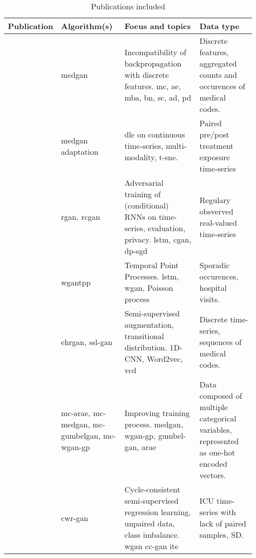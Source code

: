     \begin{sidewaystable}[htbp]
    \scriptsize
    \centering
    \caption{Publications included}\label{tab:publications}
      
        \begin{tabularx}{\textwidth}{@{}p{4cm}XXX@{}} \toprule
            Publication & Algorithm(s) & Focus and topics & Data type \\ \midrule
            
            \cite{Choi2017-nt}
            & \gls{medgan} 
            & Incompatibility of backpropagation with discrete features. \gls{mc}, \gls{ae}, \gls{mba}, \gls{bn}, \gls{sc}, \gls{ad}, \gls{pd}
            & Discrete features, aggregated counts and occurences of medical codes.\\
            
            \cite{yahi2017generative} 
            & \gls{medgan} adaptation
            & \Gls{dle} on continuous time-series, multi-modality, \gls{t-sne}.
            & Paired pre/post treatment exposure time-series\\
            
            \cite{esteban2017real}
            & \gls{rgan}, \gls{rcgan} 
            &  Adversarial training of (conditional) \glspl{RNN} on time-series, evaluation, privacy. \gls{lstm}, \gls{cgan}, \gls{dp-sgd}
            & Regulary obsverved real-valued time-series\\
            
            \cite{Xiao2017-lh} 
            & \gls{wgantpp} 
            & Temporal Point Processes. \gls{lstm}, \gls{wgan}, Poisson process
            & Sporadic occurences, hospital visits.\\
            
            \cite{Che_2017} 
            & \gls{ehrgan}, \gls{ssl-gan} 
            & Semi-supervised augmentation, transitional distribution. 1D-CNN, Word2vec, \gls{vcd}
            & Discrete time-series, sequences of medical codes. \\
            
            \cite{Camino2018-re} 
            &\gls{mc-arae}, \gls{mc-medgan}, \gls{mc-gumbelgan}, \gls{mc-wgan-gp} 
            & Improving training process. \gls{medgan}, \gls{wgan-gp}, \gls{gumbel-gan}, \gls{arae}
            & Data composed of multiple categorical variables, represented as one-hot encoded vectors. \\
            
            \cite{mcdermott2018semi}
            & \gls{cwr-gan}
            & Cycle-consistent semi-supervised regression learning, unpaired data, class imbalance. \gls{wgan} \gls{cc-gan} \gls{ite}
            & ICU time-series with lack of paired samples, \gls{SD}. \\
            

\end{tabularx}
\end{sidewaystable}
